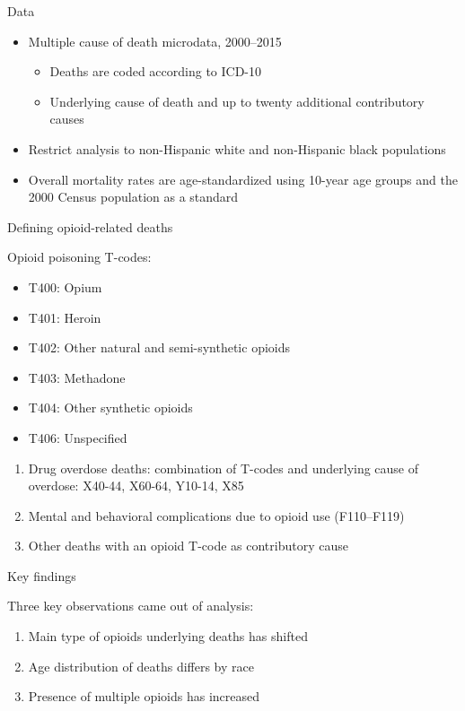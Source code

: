 \documentclass[ignorenonframetext,]{beamer}
\providecommand{\tightlist}{%
\setlength{\itemsep}{0pt}\setlength{\parskip}{0pt}}
\begin{document}
\begin{frame}{Data}

\begin{itemize}
\tightlist
\item
  Multiple cause of death microdata, 2000--2015

  \begin{itemize}
  \tightlist
  \item
    Deaths are coded according to ICD-10
  \item
    Underlying cause of death and up to twenty additional contributory
    causes
  \end{itemize}
\item
  Restrict analysis to non-Hispanic white and non-Hispanic black
  populations
\item
  Overall mortality rates are age-standardized using 10-year age groups
  and the 2000 Census population as a standard 
\end{itemize}

\end{frame}

\begin{frame}{Defining opioid-related deaths}

Opioid poisoning T-codes:

\begin{itemize}
\tightlist
\item
  T400: Opium
\item
  T401: Heroin
\item
  T402: Other natural and semi-synthetic opioids
\item
  T403: Methadone
\item
  T404: Other synthetic opioids
\item
  T406: Unspecified
\end{itemize}

\begin{enumerate}
\def\labelenumi{\arabic{enumi}.}
\tightlist
\item
  Drug overdose deaths: combination of T-codes and underlying cause of
  overdose: X40-44, X60-64, Y10-14, X85
\item
  Mental and behavioral complications due to opioid use (F110--F119)
\item
  Other deaths with an opioid T-code as contributory cause
\end{enumerate}

\end{frame}

\begin{frame}{Key findings}

Three key observations came out of analysis:

\begin{enumerate}
\def\labelenumi{\arabic{enumi}.}
\tightlist
\item
  Main type of opioids underlying deaths has shifted
\item
  Age distribution of deaths differs by race
\item
  Presence of multiple opioids has increased
\end{enumerate}

\end{frame}
\end{document}

